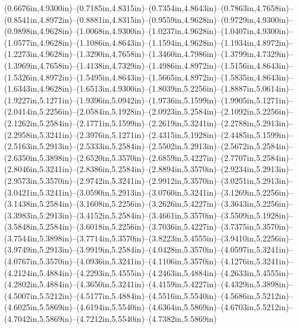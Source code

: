 (0.6676in,4.9300in)--(0.7185in,4.8315in)--(0.7354in,4.8643in)--(0.7863in,4.7658in)--(0.8541in,4.8972in)--(0.8881in,4.8315in)--(0.9559in,4.9628in)--(0.9729in,4.9300in)--(0.9898in,4.9628in)--(1.0068in,4.9300in)--(1.0237in,4.9628in)--(1.0407in,4.9300in)--(1.0577in,4.9628in)--(1.1086in,4.8643in)--(1.1594in,4.9628in)--(1.1934in,4.8972in)--(1.2273in,4.9628in)--(1.3290in,4.7658in)--(1.3460in,4.7986in)--(1.3799in,4.7329in)--(1.3969in,4.7658in)--(1.4138in,4.7329in)--(1.4986in,4.8972in)--(1.5156in,4.8643in)--(1.5326in,4.8972in)--(1.5495in,4.8643in)--(1.5665in,4.8972in)--(1.5835in,4.8643in)--(1.6343in,4.9628in)--(1.6513in,4.9300in)--(1.8039in,5.2256in)--(1.8887in,5.0614in)--(1.9227in,5.1271in)--(1.9396in,5.0942in)--(1.9736in,5.1599in)--(1.9905in,5.1271in)--(2.0414in,5.2256in)--(2.0584in,5.1928in)--(2.0923in,5.2584in)--(2.1092in,5.2256in)--(2.1262in,5.2584in)--(2.1771in,5.1599in)--(2.2619in,5.3241in)--(2.2788in,5.2913in)--(2.2958in,5.3241in)--(2.3976in,5.1271in)--(2.4315in,5.1928in)--(2.4485in,5.1599in)--(2.5163in,5.2913in)--(2.5333in,5.2584in)--(2.5502in,5.2913in)--(2.5672in,5.2584in)--(2.6350in,5.3898in)--(2.6520in,5.3570in)--(2.6859in,5.4227in)--(2.7707in,5.2584in)--(2.8046in,5.3241in)--(2.8386in,5.2584in)--(2.8894in,5.3570in)--(2.9234in,5.2913in)--(2.9573in,5.3570in)--(2.9742in,5.3241in)--(2.9912in,5.3570in)--(3.0251in,5.2913in)--(3.0421in,5.3241in)--(3.0590in,5.2913in)--(3.0760in,5.3241in)--(3.1269in,5.2256in)--(3.1438in,5.2584in)--(3.1608in,5.2256in)--(3.2626in,5.4227in)--(3.3643in,5.2256in)--(3.3983in,5.2913in)--(3.4152in,5.2584in)--(3.4661in,5.3570in)--(3.5509in,5.1928in)--(3.5848in,5.2584in)--(3.6018in,5.2256in)--(3.7036in,5.4227in)--(3.7375in,5.3570in)--(3.7544in,5.3898in)--(3.7714in,5.3570in)--(3.8223in,5.4555in)--(3.9410in,5.2256in)--(3.9749in,5.2913in)--(3.9919in,5.2584in)--(4.0428in,5.3570in)--(4.0597in,5.3241in)--(4.0767in,5.3570in)--(4.0936in,5.3241in)--(4.1106in,5.3570in)--(4.1276in,5.3241in)--(4.2124in,5.4884in)--(4.2293in,5.4555in)--(4.2463in,5.4884in)--(4.2633in,5.4555in)--(4.2802in,5.4884in)--(4.3650in,5.3241in)--(4.4159in,5.4227in)--(4.4329in,5.3898in)--(4.5007in,5.5212in)--(4.5177in,5.4884in)--(4.5516in,5.5540in)--(4.5686in,5.5212in)--(4.6025in,5.5869in)--(4.6194in,5.5540in)--(4.6364in,5.5869in)--(4.6703in,5.5212in)--(4.7042in,5.5869in)--(4.7212in,5.5540in)--(4.7382in,5.5869in) 
